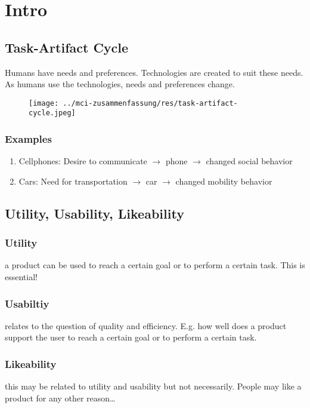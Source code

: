 \section{Intro}
	\subsection{Task-Artifact Cycle}
		Humans have needs and preferences. Technologies are created to suit these needs. As humans use the technologies, needs	and preferences change.
		\begin{figure}[h!]
			\texttt{[image: ../mci-zusammenfassung/res/task-artifact-cycle.jpeg]}
		\end{figure}
	
		\subsubsection*{Examples}
			\begin{enumerate}
				\item Cellphones: Desire to communicate $ \rightarrow $ phone $ \rightarrow $ changed social behavior
				\item Cars: Need for transportation $ \rightarrow $ car $ \rightarrow $ changed mobility behavior \biglb
			\end{enumerate}
	
	
	
	\subsection{Utility, Usability, Likeability}
		\subsubsection*{Utility}
			a product can be used to reach a certain goal or to perform a certain task. This is	essential!

			
		\subsubsection*{Usabiltiy}
			relates to the question of quality and efficiency. E.g. how well does a product	support the user to reach a certain goal or to perform a certain task.
			
		\subsubsection*{Likeability}
			this may be related to utility and usability but not necessarily. People may like a
			product for any other reason\ldots
		